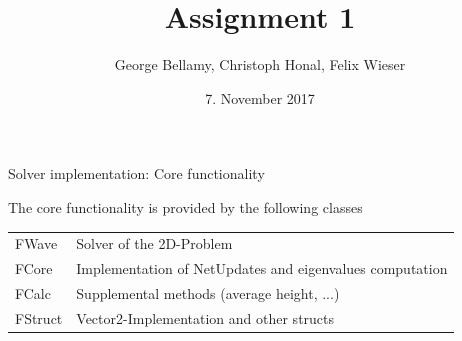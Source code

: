 \documentclass[shortpres]{beamer}
\title[{Tsunami simulation}]{Assignment 1}
\author[Bellamy, Honal, Wieser]{George Bellamy, Christoph Honal, Felix Wieser\\\vspace{10pt}{\small Bachelorpraktikum}}
\institute[TU M\"unchen]{Technical University of Munich}
\date{7. November 2017}
\begin{document}
\maketitle

\begin{frame}{Solver implementation: Core functionality}
	\begin{figure}
		{
			\hspace{20pt}
		}
		\only<2>
		{
			\hspace{20pt}
		}
	\end{figure}
	
	The core functionality is provided by the following classes
	\begin{tabular}{ll}
		FWave & Solver of the 2D-Problem\\
		FCore & Implementation of NetUpdates and eigenvalues computation\\
		\pause
		FCalc & Supplemental methods (average height, ...)\\
		FStruct & Vector2-Implementation and other structs
	\end{tabular}
\end{frame}
\end{document}
